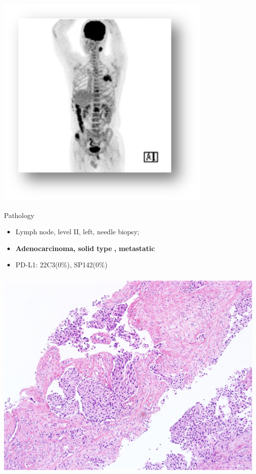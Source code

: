 \documentclass[
  ignorenonframetext,
]{beamer}
\providecommand{\tightlist}{%
  \setlength{\itemsep}{0pt}\setlength{\parskip}{0pt}}
\begin{document}
\begin{frame}

\includegraphics[width=\textwidth,height=4.16667in]{assets/img/bone_scan.png}

\end{frame}

\begin{frame}{Pathology}
\protect\hypertarget{pathology}{}

\begin{itemize}
\tightlist
\item
  Lymph node, level II, left, needle biopsy;
\item
  \textbf{Adenocarcinoma, solid type} \textbf{,} \textbf{metastatic}
\item
  PD-L1: 22C3(0\%), SP142(0\%)
\end{itemize}

\includegraphics[width=\textwidth,height=4.16667in]{assets/img/biopsy.png}

\end{frame}
\end{document}
